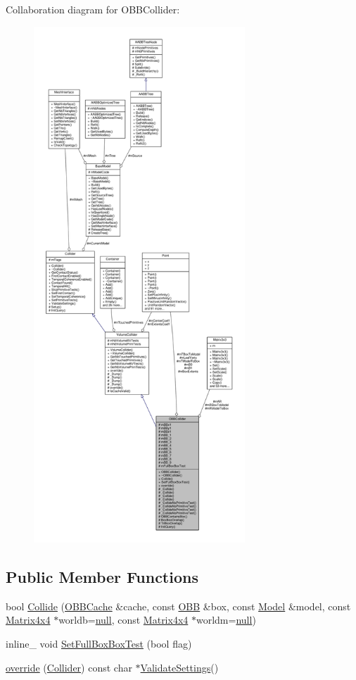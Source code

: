 Collaboration diagram for O\+B\+B\+Collider\+:
\nopagebreak
\begin{figure}[H]
\begin{center}
\leavevmode
\includegraphics[height=550pt]{d4/df4/classOBBCollider__coll__graph}
\end{center}
\end{figure}
\subsection*{Public Member Functions}
\begin{DoxyCompactItemize}
\item 
bool \hyperlink{classOBBCollider_a243f4dd2ddba99e708b1da21ff44f82a}{Collide} (\hyperlink{structOBBCache}{O\+B\+B\+Cache} \&cache, const \hyperlink{classOBB}{O\+BB} \&box, const \hyperlink{classModel}{Model} \&model, const \hyperlink{classMatrix4x4}{Matrix4x4} $\ast$worldb=\hyperlink{IceTypes_8h_ac97b8ee753e4405397a42ad5799b0f9e}{null}, const \hyperlink{classMatrix4x4}{Matrix4x4} $\ast$worldm=\hyperlink{IceTypes_8h_ac97b8ee753e4405397a42ad5799b0f9e}{null})
\item 
inline\+\_\+ void \hyperlink{classOBBCollider_a938d1253a6ec0db3adc98aac49cb0e00}{Set\+Full\+Box\+Box\+Test} (bool flag)
\item 
\hyperlink{classOBBCollider_ad59ff02a25c37bfdf32aee68e614da70}{override} (\hyperlink{classCollider}{Collider}) const char $\ast$\hyperlink{classCollider_a225d4861b2184336433894174c6e3e2d}{Validate\+Settings}()
\end{DoxyCompactItemize}
